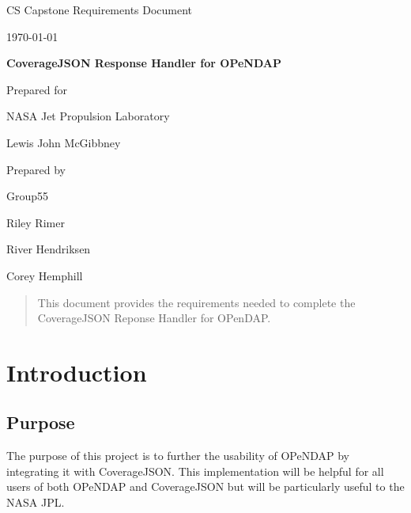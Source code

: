 \documentclass[onecolumn, draftclsnofoot,10pt, compsoc]{IEEEtran}
\def \CapstoneTeamNumber{55}
\def \GroupMemberOne{Riley Rimer}
\def \GroupMemberTwo{River Hendriksen}
\def \GroupMemberThree{Corey Hemphill}
\def \CapstoneProjectName{CoverageJSON Response Handler for OPeNDAP}
\def \CapstoneSponsorCompany{NASA Jet Propulsion Laboratory}
\def \CapstoneSponsorPerson{Lewis John McGibbney}
\def \DocType{	%
				Requirements Document
				}
\newcommand{\NameSigPair}[1]{\par
\makebox[2.75in][r]{#1} \hfil 	\makebox[3.25in]{\makebox[2.25in]{\hrulefill} \hfill		\makebox[.75in]{\hrulefill}}
\par\vspace{-12pt} \textit{\tiny\noindent
\makebox[2.75in]{} \hfil		\makebox[3.25in]{\makebox[2.25in][r]{Signature} \hfill	\makebox[.75in][r]{Date}}}}
\renewcommand{\NameSigPair}[1]{#1}
\begin{document}
\begin{titlepage}
    \begin{singlespace}
        \hfill    
        \par\vspace{.2in}
        \centering
        \scshape{
            \huge CS Capstone \DocType \par
            {\large\today}\par
            \vspace{.5in}
            \textbf{\Huge\CapstoneProjectName}\par
                        \vspace{.5in}

            \vfill
            {\large Prepared for}\par
            \Huge \CapstoneSponsorCompany\par
            \vspace{5pt}
            {\Large\NameSigPair{\CapstoneSponsorPerson}\par}
            {\large Prepared by }\par
            Group\CapstoneTeamNumber\par
            \vspace{5pt}
            {\Large
                \NameSigPair{\GroupMemberOne}\par
                \NameSigPair{\GroupMemberTwo}\par
                \NameSigPair{\GroupMemberThree}\par
            }
            \vspace{20pt}
        }
        \begin{abstract}
        	This document provides the requirements needed to complete the CoverageJSON Reponse Handler for OPenDAP. 
        \end{abstract}     
    \end{singlespace}
\end{titlepage}
\newpage
{}
\clearpage

\section{Introduction}
\subsection{Purpose}
The purpose of this project is to further the usability of OPeNDAP by integrating it with CoverageJSON.
This implementation will be helpful for all users of both OPeNDAP and CoverageJSON but will be particularly useful to the NASA JPL.
\end{document}
